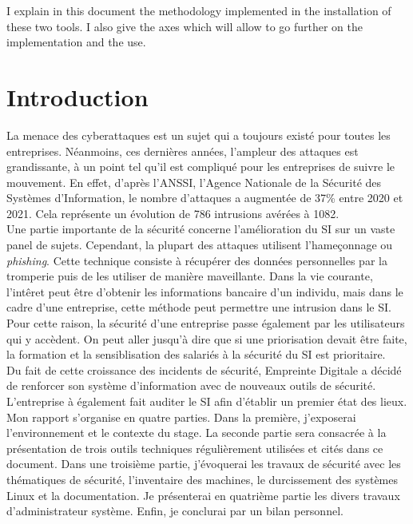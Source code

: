 \documentclass[12pt, a4paper, twoside]{article}
\begin{document}
I explain in this document the methodology implemented in the installation of these two tools.
I also give the axes which will allow to go further on the implementation and the use.

\newpage
\section*{Introduction}
La menace des cyberattaques est un sujet qui a toujours existé pour toutes les entreprises.
Néanmoins, ces dernières années, l'ampleur des attaques est grandissante, à un point tel qu'il est compliqué pour les entreprises de suivre le mouvement.
En effet, d'après l'\gls{ANSSI}, l'Agence Nationale de la Sécurité des Systèmes d'Information, le nombre d'attaques a augmentée de 37\% entre 2020 et 2021.
Cela représente un évolution de 786 intrusions avérées à 1082. \\

Une partie importante de la sécurité concerne l'amélioration du SI sur un vaste panel de sujets.
Cependant, la plupart des attaques utilisent l'hameçonnage ou \textit{phishing}.
Cette technique consiste à récupérer des données personnelles par la tromperie puis de les utiliser de manière maveillante.
Dans la vie courante, l'intêret peut être d'obtenir les informations bancaire d'un individu, mais dans le cadre d'une entreprise, cette méthode peut permettre une intrusion dans le \gls{SI}.
Pour cette raison, la sécurité d'une entreprise passe également par les utilisateurs qui y accèdent.
On peut aller jusqu'à dire que si une priorisation devait être faite, la formation et la sensiblisation des salariés à la sécurité du \gls{SI} est prioritaire.\\

Du fait de cette croissance des incidents de sécurité, Empreinte Digitale a décidé de renforcer son système d'information avec de nouveaux outils de sécurité.
L'entreprise à également fait auditer le \gls{SI} afin d'établir un premier état des lieux. \\

Mon rapport s'organise en quatre parties. 
Dans la première, j'exposerai l'environnement et le contexte du stage. 
La seconde partie sera consacrée à la présentation de trois outils techniques régulièrement utilisées et cités dans ce document. 
Dans une troisième partie, j'évoquerai les travaux de sécurité avec les thématiques de sécurité, l'inventaire des machines, le durcissement des systèmes \gls{Linux} et la documentation. 
Je présenterai en quatrième partie les divers travaux d'administrateur système. 
Enfin, je conclurai par un bilan personnel.\\
\end{document}
